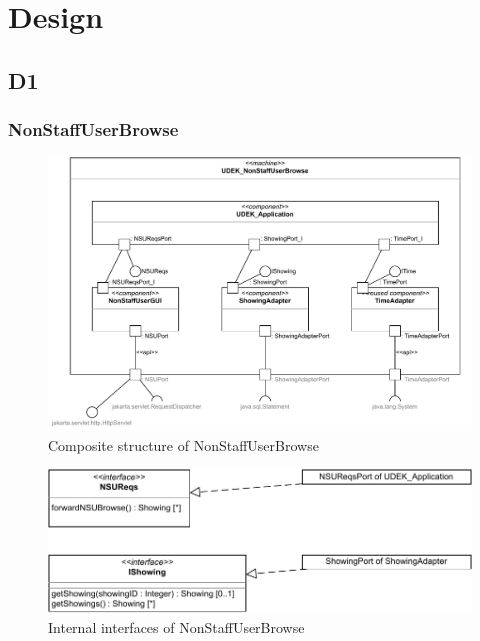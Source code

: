 \documentclass[a4paper,10pt,titlepage,bibtotoc,bibtotocnumbered]{scrreprt}
\begin{document}
\chapter{Design}

\section{D1}

\subsection{NonStaffUserBrowse}

\begin{figure}[H]
    \centering
    \includegraphics[width = \textwidth]{figures/08/A08_Browse-Composite Structure.drawio.pdf}
    \caption{Composite structure of NonStaffUserBrowse}
    \label{figure:NonStaffUserBrowse_composite_structure}
\end{figure}

\begin{figure}[H]
\centering
\includegraphics[width = \textwidth]{figures/08/A08_Browse-Internal Interfaces.drawio.pdf}
\caption{Internal interfaces of NonStaffUserBrowse}
\label{figure:NonStaffUserBrowse_internal_interfaces}
\end{figure}
\end{document}
